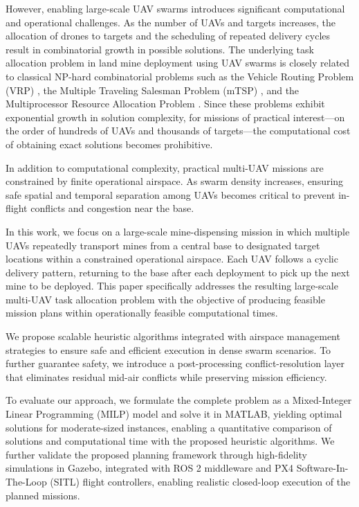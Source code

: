 \documentclass[subscriptcorrection,upint,nolists, varvw,barcolor=Goldenrod3,mathalfa=cal=euler,balance,hyphenate,french]{asmejour} %
\begin{document}
However, enabling large-scale UAV swarms introduces significant computational and operational challenges. 
As the number of UAVs and targets increases, the allocation of drones to targets and the scheduling of repeated delivery cycles result in combinatorial growth in possible solutions.
The underlying task allocation problem in land mine deployment using UAV swarms is closely related to classical NP-hard combinatorial problems such as the Vehicle Routing Problem (VRP) \cite{Dorling2017}, the Multiple Traveling Salesman Problem (mTSP) \cite{Assaf2017}, and the Multiprocessor Resource Allocation Problem \cite{Huang2016}.
Since these problems exhibit exponential growth in solution complexity, for missions of practical interest—on the order of hundreds of UAVs and thousands of targets—the computational cost of obtaining exact solutions becomes prohibitive.

In addition to computational complexity, practical multi-UAV missions are constrained by finite operational airspace.
As swarm density increases, ensuring safe spatial and temporal separation among UAVs becomes critical to prevent in-flight conflicts and congestion near the base.

In this work, we focus on a large-scale mine-dispensing mission in which multiple UAVs repeatedly transport mines from a central base to designated target locations within a constrained operational airspace. Each UAV follows a cyclic delivery pattern, returning to the base after each deployment to pick up the next mine to be deployed. 
This paper specifically addresses the resulting large-scale multi-UAV task allocation problem with the objective of producing feasible mission plans within operationally feasible computational times.


We propose scalable heuristic algorithms integrated with airspace management strategies to ensure safe and efficient execution in dense swarm scenarios. To further guarantee safety, we introduce a post-processing conflict-resolution layer that eliminates residual mid-air conflicts while preserving mission efficiency.

To evaluate our approach, we formulate the complete problem as a Mixed-Integer Linear Programming (MILP) model and solve it in MATLAB, yielding optimal solutions for moderate-sized instances, enabling a quantitative comparison of solutions and computational time with the proposed heuristic algorithms. 
We further validate the proposed planning framework through high-fidelity simulations in Gazebo, integrated with ROS 2 middleware and PX4 Software-In-The-Loop (SITL) flight controllers, enabling realistic closed-loop execution of the planned missions.
\end{document}

